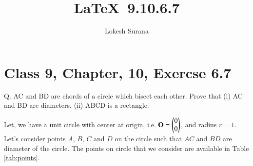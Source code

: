 \documentclass[journal,12pt,twocolumn]{IEEEtran}
\let\vec\mathbf
\begin{document}
\vspace{3cm}
\title{\LaTeX\ 9.10.6.7}
\author{Lokesh Surana}
\maketitle
\section*{Class 9, Chapter, 10, Exercse 6.7}

Q. AC and BD are chords of a circle which bisect each other. Prove that (i) AC and BD are diameters, (ii) ABCD is a rectangle.

\solution
Let, we have a unit circle with center at origin, i.e. $\vec{O} = \myvec{0\\0}$, and radius $r = 1$.
Let's consider points $A$, $B$, $C$ and $D$ on the circle such that $AC$ and $BD$ are diameter of the circle.
The points on circle that we consider are available in Table \eqref{tab:points}.

\begin{table}[ht!]

\caption{}
\label{tab:points}
\end{table}
\end{document}
